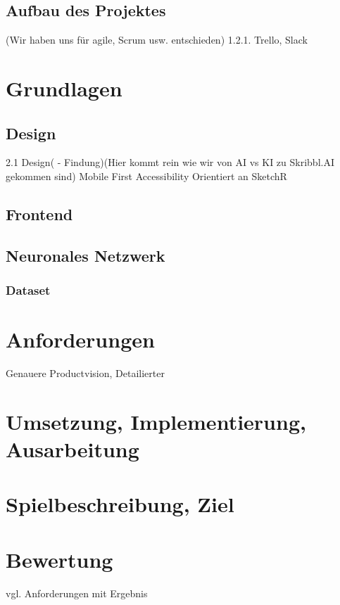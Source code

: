 \documentclass[11pt]{article}
\begin{document}
\subsection{Aufbau des Projektes}
    (Wir haben uns für agile, Scrum usw. entschieden)    1.2.1. Trello, Slack

\section{Grundlagen}
\subsection{Design}
2.1 Design( - Findung)(Hier kommt rein wie wir von AI vs KI zu Skribbl.AI gekommen sind)
Mobile First
Accessibility
Orientiert an SketchR
\subsection{Frontend}
\subsection{Neuronales Netzwerk}
\subsubsection{Dataset}
\section{Anforderungen}
Genauere Productvision, Detailierter
\section{Umsetzung, Implementierung, Ausarbeitung}
\section{Spielbeschreibung, Ziel}
\section{Bewertung}
vgl. Anforderungen mit Ergebnis

\printbibliography
\end{document}
